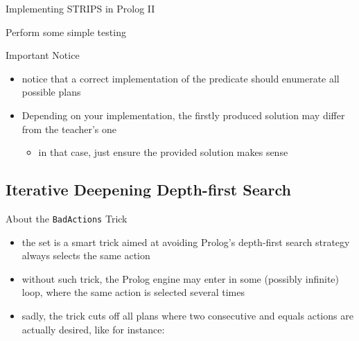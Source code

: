 \documentclass[presentation]{beamer}\mode<presentation>{\usetheme{AMSBolognaFC}}
\begin{document}
\begin{frame}[c]{Implementing STRIPS in Prolog II}

    \begin{exampleblock}{Perform some simple testing}
        
    \end{exampleblock}

    \vfill

    \begin{alertblock}{Important Notice}
        \begin{itemize}

            \item notice that a correct implementation of the  predicate should enumerate all possible plans

            \item Depending on your implementation, the firstly produced solution may differ from the teacher's one
            \begin{itemize}
                \item in that case, just ensure the provided solution makes sense
            \end{itemize}
        \end{itemize}
    \end{alertblock}

\end{frame}

\subsection{Iterative Deepening Depth-first Search}

\begin{frame}[c]{About the \texttt{BadActions} Trick}

    \begin{itemize}
        \item the  set is a smart trick aimed at avoiding Prolog's \alert{depth-first} search strategy always selects the same action

        \vfill

        \item without such trick, the Prolog engine may enter in some (possibly \alert{infinite}) loop, where the same action is selected several times

        \vfill

        \item sadly, the trick \alert{cuts off} all plans where two consecutive and equals actions are actually desired, like for instance:
        
    \end{itemize}

\end{frame}
\end{document}
